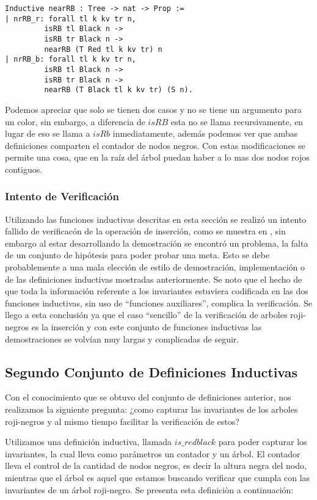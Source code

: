 \documentclass[letterpaper,12pt,oneside]{book}
\newcommand{\arn}{árbol roji-negro}
\newcommand{\arns}{arboles roji-negros}
\theoremstyle{plain}
\theoremstyle{definition}
\theoremstyle{remark}
\begin{document}
\begin{verbatim}
Inductive nearRB : Tree -> nat -> Prop :=
| nrRB_r: forall tl k kv tr n,
         isRB tl Black n ->
         isRB tr Black n ->
         nearRB (T Red tl k kv tr) n
| nrRB_b: forall tl k kv tr n,
         isRB tl Black n ->
         isRB tr Black n ->
         nearRB (T Black tl k kv tr) (S n).
\end{verbatim}
Podemos apreciar que solo se tienen dos casos y no se tiene un argumento para un color, sin embargo, a 
diferencia de $isRB$ esta no se llama recursivamente, en lugar de eso se llama a $isRb$ inmediatamente, 
además podemos ver que ambas definiciones comparten el contador de nodos negros.
Con estas modificaciones se permite una cosa, que en la ra\'iz del \'arbol puedan haber a lo mas dos 
nodos rojos contiguos.

\subsubsection{Intento de Verificaci\'on}
Utilizando las funciones inductivas descritas en esta secci\'on se realiz\'o un intento fallido de 
verificac\'on de la operaci\'on de inserci\'on, como se muestra en \cite{appel}, sin embargo al estar 
desarrollando la demostraci\'on se encontró un problema, la falta de un conjunto de hipótesis para poder 
probar una meta. Esto se debe probablemente a una mala elección de estilo de demostraci\'on, 
implementaci\'on o de las definiciones inductivas mostradas anteriormente. Se noto que el hecho de que 
toda la informaci\'on referente a los invariantes estuviera codificada en las dos funciones inductivas, 
sin uso de ``funciones auxiliares'', complica la verificaci\'on. Se llego a esta conclusi\'on ya que el 
caso ``sencillo'' de la verificaci\'on de {\arns} es la inserci\'on y con este conjunto de funciones 
inductivas las demostraciones se volvían muy largas y complicadas de seguir.

\subsection{Segundo Conjunto de Definiciones Inductivas}

Con el conocimiento que se obtuvo del conjunto de definiciones anterior, nos realizamos la siguiente 
pregunta: ¿como capturar las invariantes de los {\arns} y al mismo tiempo facilitar la verificaci\'on de 
estos?

Utilizamos una definición inductiva, llamada $is\_redblack$ para poder capturar los invariantes, la cual
lleva como parámetros un contador y un \'arbol. El contador lleva el control de la cantidad de nodos
negros, es decir la altura negra del nodo, mientras que el \'arbol es aquel que estamos buscando
verificar que cumpla con las invariantes de un {\arn}. Se presenta esta definici\`on a continuaci\'on:
\end{document}
